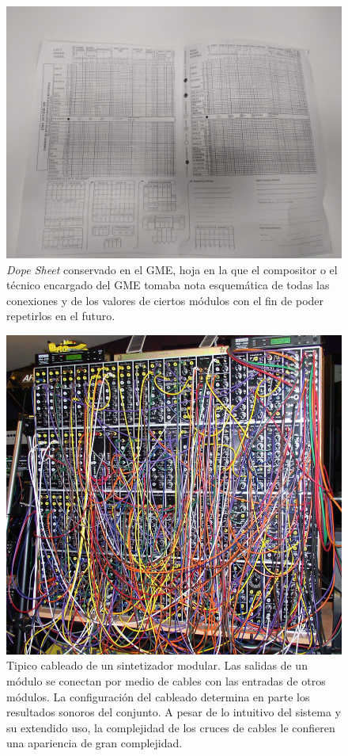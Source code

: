 \begin{figure}
	\centering
	\includegraphics[width=1\textwidth]{images/dope_sheet_GME}
	\caption[\textit{Dope Sheet} conservado en el GME]{\textit{Dope Sheet} conservado en el GME, hoja en la que el compositor o el técnico encargado del GME tomaba nota esquemática de todas las conexiones y de los valores de ciertos módulos con el fin de poder repetirlos en el futuro.}
	\label{fig:dope_sheet_GME}
\end{figure}

\begin{figure}
	\centering
	\includegraphics[width=1\textwidth]{images/sinte_modular}
	\caption[Tipico cableado de un sintetizador modular]{Tipico cableado de un sintetizador modular. Las salidas de un módulo se conectan por medio de cables con las entradas de otros módulos. La configuración del cableado determina en parte los resultados sonoros del conjunto. A pesar de lo intuitivo del sistema y su extendido uso, la complejidad de los cruces de cables le confieren una apariencia de gran complejidad.}
	\label{fig:sintetizador_modular}
\end{figure}

